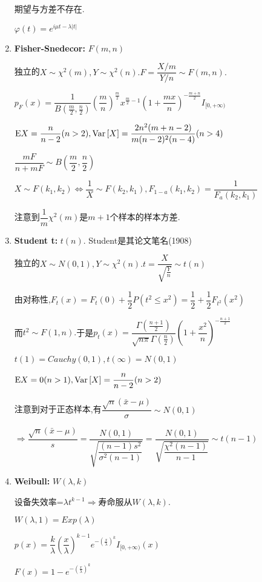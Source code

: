 \begin{enumerate}
期望与方差不存在.

$ \varphi(t) = e^{i\mu t - \lambda |t|}$

 \item \textbf{Fisher-Snedecor:} $ F(m, n)$

   独立的$X\sim \chi^2(m),Y\sim\chi^2(n).F=\dfrac{X/m}{Y/n}\sim F(m,n).$

   $ p_{F}(x) =
   \dfrac{1}{B(\frac{m}{2},\frac{n}{2})}(\dfrac{m}{n})^{\frac{m}{2}}x^{\frac{m}{2}-1}(1+\dfrac{mx}{n})^{-\frac{m+n}{2}} I_{[0,+\infty)}$

   $ \text{E}X = \dfrac{n}{n-2}(n>2), \text{Var}\left[X\right] = \dfrac{2n^2(m+n-2)}{m(n-2)^2(n-4)}(n>4)$

   $ \dfrac{mF}{n+mF} \sim B(\dfrac{m}{2},\dfrac{n}{2})$

   $ X\sim F(k_1,k_2) \Leftrightarrow \dfrac{1}{X}\sim F(k_2,k_1) , F_{1-a}(k_1,k_2) = \dfrac{1}{F_a(k_2,k_1)}$

     注意到$ \dfrac{1}{m}\chi^2(m)$是$ m+1$个样本的样本方差.

   \item \textbf{Student t:} $ t(n)$. Student是其论文笔名(1908)

     独立的$X\sim N(0,1),Y\sim\chi^2(n).t=\dfrac{X}{\sqrt{\frac{Y}{n}}}\sim t(n) $

     由对称性,$ F_t(x)=F_t(0)+\dfrac{1}{2}P(t^2\le x^2)=\dfrac{1}{2}+\dfrac{1}{2}F_{t^2}(x^2)$

     而$ t^2\sim F(1,n).$于是$ p_t(x)=\dfrac{\Gamma(\frac{n+1}{2})}{\sqrt{n\pi}\Gamma(\frac{n}{2})}(1+\dfrac{x^2}{n})^{-\frac{n+1}{2}}$

     $t(1) = Cauchy(0,1) ,t(\infty)=N(0,1)$

     $ \text{E}X=0(n>1), \text{Var}\left[X\right]=\dfrac{n}{n-2}(n>2)$

     注意到对于正态样本,有$ \dfrac{\sqrt{n}(\bar{x}-\mu)}{\sigma}\sim N(0,1)$

     $ \Rightarrow \dfrac{\sqrt{n}(\bar{x}-\mu)}{s} =
   \dfrac{N(0,1)}{\sqrt{\dfrac{(n-1)s^2}{\sigma^2(n-1)}}} =
   \dfrac{N(0,1)}{\sqrt{\dfrac{\chi^2(n-1)}{n-1}}} \sim t(n-1)$
 \item \textbf{Weibull:} $ W(\lambda,k)$

   设备失效率=$ \lambda t^{k-1}\Rightarrow  寿命服从W(\lambda,k). $

 $ W(\lambda,1) = Exp(\lambda)$

 $ p(x) = \dfrac{k}{\lambda}(\dfrac{x}{\lambda})^{k-1}e^{-(\frac{x}{\lambda})^k}I_{[0,+\infty)}(x)$

 $ F(x) = 1-e^{-(\frac{x}{\lambda})^k}$


\end{enumerate}
